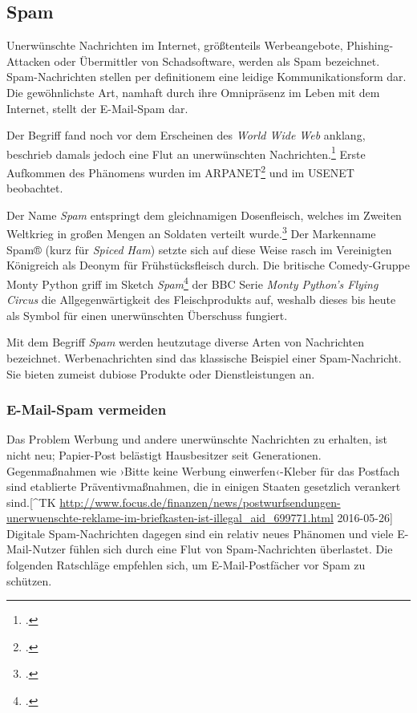\subsection{Spam} %
\label{sub:spam}
Unerwünschte Nachrichten im Internet, größtenteils Werbeangebote,
Phishing-Attacken oder Übermittler von Schadsoftware, werden als Spam
bezeichnet. Spam-Nachrichten stellen per definitionem eine leidige
Kommunikationsform dar. Die gewöhnlichste Art, namhaft durch ihre Omnipräsenz
im Leben mit dem Internet, stellt der E-Mail-Spam dar.

Der Begriff fand noch vor dem Erscheinen des \emph{World Wide Web} anklang,
beschrieb damals jedoch eine Flut an unerwünschten
Nachrichten.\footcite{originTermSpam} Erste Aufkommen des Phänomens wurden im
ARPANET\footcite{junkMailProblem} und im USENET beobachtet.

Der Name \emph{Spam} entspringt dem gleichnamigen Dosenfleisch, welches im
Zweiten Weltkrieg in großen Mengen an Soldaten verteilt
wurde.\footcite{lifeDuringSecondWW} Der Markenname Spam® (kurz für \emph{Spiced
Ham}) setzte sich auf diese Weise rasch im Vereinigten Königreich als Deonym
für Frühstücksfleisch durch. Die britische Comedy-Gruppe Monty Python griff im
Sketch \emph{Spam}\footcite{spamMontyPython} der BBC Serie \emph{Monty Python’s
Flying Circus} die Allgegenwärtigkeit des Fleischprodukts auf, weshalb dieses
bis heute als Symbol für einen unerwünschten Überschuss fungiert.

Mit dem Begriff \emph{Spam} werden heutzutage diverse Arten von Nachrichten
bezeichnet. Werbenachrichten sind das klassische Beispiel einer Spam-Nachricht.
Sie bieten zumeist dubiose Produkte oder Dienstleistungen an.

\subsubsection{E-Mail-Spam vermeiden}
\label{ssub:e-mail-spam-vermeiden}

Das Problem Werbung und andere unerwünschte Nachrichten zu erhalten, ist
nicht neu; Papier-Post belästigt Hausbesitzer seit Generationen.
Gegenmaßnahmen wie ›Bitte keine Werbung einwerfen‹-Kleber für das
Postfach sind etablierte Präventivmaßnahmen, die in einigen Staaten
gesetzlich verankert sind.{[}\^{}TK
\url{http://www.focus.de/finanzen/news/postwurfsendungen-unerwuenschte-reklame-im-briefkasten-ist-illegal_aid_699771.html}
2016-05-26{]} Digitale Spam-Nachrichten dagegen sind ein relativ neues
Phänomen und viele E-Mail-Nutzer fühlen sich durch eine Flut von
Spam-Nachrichten überlastet. Die folgenden Ratschläge empfehlen sich, um
E-Mail-Postfächer vor Spam zu schützen.


